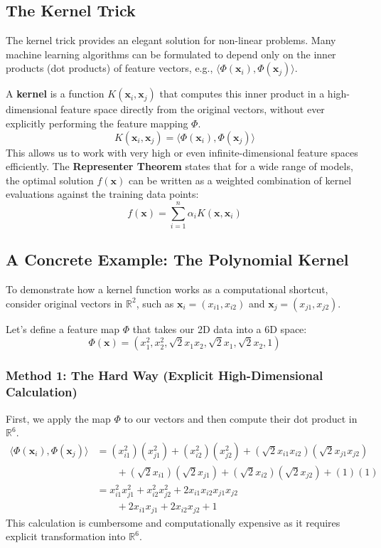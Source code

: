 \documentclass{article}
\begin{document}
\begin{multicols}{2}
\section{The Kernel Trick}
The kernel trick provides an elegant solution for non-linear problems. Many machine learning algorithms can be formulated to depend only on the inner products (dot products) of feature vectors, e.g., $\langle \Phi(\mathbf{x}_i), \Phi(\mathbf{x}_j) \rangle$.

A \textbf{kernel} is a function $K(\mathbf{x}_i, \mathbf{x}_j)$ that computes this inner product in a high-dimensional feature space directly from the original vectors, without ever explicitly performing the feature mapping $\Phi$.
$$
K(\mathbf{x}_i, \mathbf{x}_j) = \langle \Phi(\mathbf{x}_i), \Phi(\mathbf{x}_j) \rangle
$$
This allows us to work with very high or even infinite-dimensional feature spaces efficiently. The \textbf{Representer Theorem} states that for a wide range of models, the optimal solution $f(\mathbf{x})$ can be written as a weighted combination of kernel evaluations against the training data points:
$$
f(\mathbf{x}) = \sum_{i=1}^{n} \alpha_i K(\mathbf{x}, \mathbf{x}_i)
$$

\subsection{A Concrete Example: The Polynomial Kernel}
To demonstrate how a kernel function works as a computational shortcut, consider original vectors in $\mathbb{R}^2$, such as $\mathbf{x}_i = (x_{i1}, x_{i2})$ and $\mathbf{x}_j = (x_{j1}, x_{j2})$.

Let's define a feature map $\Phi$ that takes our 2D data into a 6D space:
$$\Phi(\mathbf{x}) = (x_1^2, x_2^2, \sqrt{2}x_1x_2, \sqrt{2}x_1, \sqrt{2}x_2, 1)$$

\subsubsection{Method 1: The Hard Way (Explicit High-Dimensional Calculation)}
First, we apply the map $\Phi$ to our vectors and then compute their dot product in $\mathbb{R}^6$.
\begin{align*}
    \langle \Phi(\mathbf{x}_i), \Phi(\mathbf{x}_j) \rangle 
    &= (x_{i1}^2)(x_{j1}^2) + (x_{i2}^2)(x_{j2}^2) + (\sqrt{2}x_{i1}x_{i2})(\sqrt{2}x_{j1}x_{j2}) \\
    &\qquad + (\sqrt{2}x_{i1})(\sqrt{2}x_{j1}) + (\sqrt{2}x_{i2})(\sqrt{2}x_{j2}) + (1)(1) \\
    &= x_{i1}^2x_{j1}^2 + x_{i2}^2x_{j2}^2 + 2x_{i1}x_{i2}x_{j1}x_{j2} \\
    &\qquad + 2x_{i1}x_{j1} + 2x_{i2}x_{j2} + 1
\end{align*}
This calculation is cumbersome and computationally expensive as it requires explicit transformation into $\mathbb{R}^6$.


\end{multicols}
\end{document}
